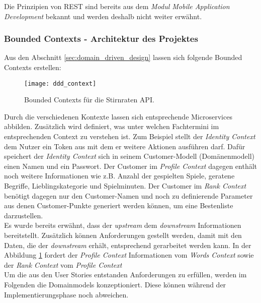 {Die Prinzipien von REST sind bereits aus dem \textit{Modul Mobile Application Development} bekannt und werden deshalb nicht weiter erwähnt. 


\subsubsection{Bounded Contexts - Architektur des Projektes}

Aus den Abschnitt \ref{sec:domain_driven_design} lassen sich folgende Bounded Contexts erstellen: 

\begin{figure}[ht]
	\centering
	\texttt{[image: ddd\_context]}
	\caption[Bounded Contexts für Stirnraten] {Bounded Contexts für die Stirnraten API.}
	\label{fig:ddd_context}
\end{figure}

Durch die verschiedenen Kontexte lassen sich entsprechende Microservices abbilden. Zusätzlich wird definiert, was unter welchen Fachtermini im entsprechenden Context zu verstehen ist. Zum Beispiel stellt der \textit{Identity Context} dem Nutzer ein Token aus mit dem er weitere Aktionen ausführen darf. Dafür speichert der \textit{Identity Context} sich in seinem Customer-Modell (Domänenmodell) einen Namen und ein Passwort. Der Customer im \textit{Profile Context} dagegen enthält noch weitere Informationen wie z.B. Anzahl der gespielten Spiele, geratene Begriffe, Lieblingskategorie und Spielminuten. Der Customer im \textit{Rank Context} benötigt dagegen nur den Customer-Namen und noch zu definierende Parameter aus denen Customer-Punkte generiert werden können, um eine Bestenliste darzustellen.\\

Es wurde bereits erwähnt, dass der \textit{upstream} dem \textit{downstream} Informationen bereitstellt. Zusätzlich können Anforderungen gestellt werden, damit mit den Daten, die der \textit{downstream} erhält, entsprechend gerarbeitet werden kann. In der Abbildung \ref{fig:ddd_context} fordert der \textit{Profile Context} Informationen vom \textit{Words Context} sowie der \textit{Rank Context} vom \textit{Profile Context}  \\

Um die aus den User Stories entstanden Anforderungen zu erfüllen, werden im Folgenden die Domainmodels konzeptioniert. Diese können während der Implementierungsphase noch abweichen. \\

}

